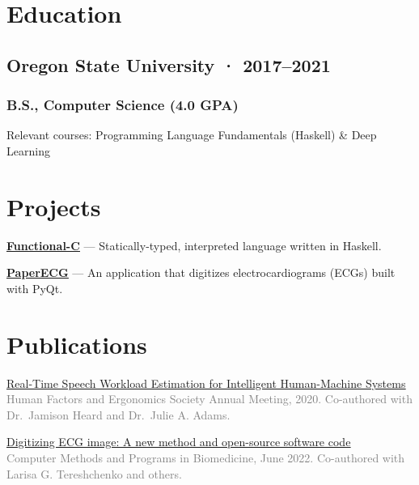 \documentclass[12pt]{article} %
\let\defaultref\href
\renewcommand{\href}[2]{%
  \defaultref{#1}{\ul{#2}}%
}
\renewcommand{\emph}[1]{%
  \textcolor{gray}{#1}%
}
\begin{document}
\begin{paracol}{2}
\setlength{\columnsep}{1em}

\hypertarget{education}{%
\section{Education}\label{education}}

\hypertarget{oregon-state-university-20172021}{%
\subsection{Oregon State University ·
2017--2021}\label{oregon-state-university-20172021}}

\vspace{-5pt}

\hypertarget{b.s.-computer-science-4.0-gpa}{%
\subsubsection{B.S., Computer Science (4.0
GPA)}\label{b.s.-computer-science-4.0-gpa}}

Relevant courses: Programming Language Fundamentals (Haskell) \& Deep
Learning

\switchcolumn

\hypertarget{projects}{%
\section{Projects}\label{projects}}

\textbf{\href{https://github.com/julianfortune/CS381Project}{Functional-C}}
--- Statically-typed, interpreted language written in Haskell.

\textbf{\href{https://github.com/Tereshchenkolab/paper-ecg}{PaperECG}}
--- An application that digitizes electrocardiograms (ECGs) built with
PyQt.

\end{paracol}

\hypertarget{publications}{%
\section{Publications}\label{publications}}

\vspace{1pt}

\href{https://doi.org/10.1177/1071181320641076}{Real-Time Speech
Workload Estimation for Intelligent Human-Machine Systems}\\
\emph{Human Factors and Ergonomics Society Annual Meeting, 2020.
Co-authored with Dr.~Jamison Heard and Dr.~Julie A. Adams.}

\href{https://doi.org/10.1101/2021.07.13.21260461}{Digitizing ECG image:
A new method and open-source software code}\\
\emph{Computer Methods and Programs in Biomedicine, June 2022.
Co-authored with Larisa G. Tereshchenko and others.}

\end{document}
